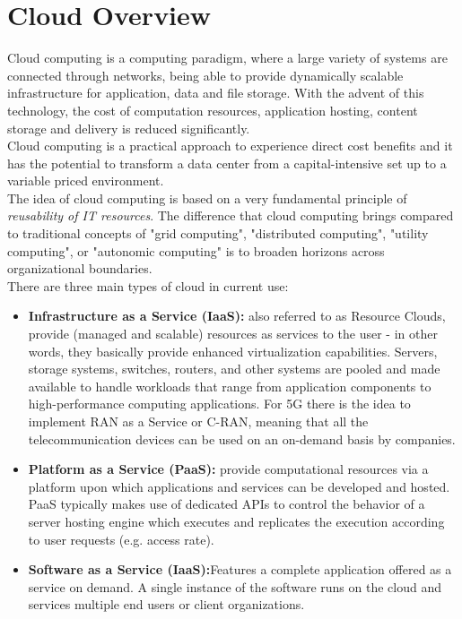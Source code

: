 \section{Cloud Overview}
\label{sec:sdr_cloud}

Cloud computing is a computing paradigm, where a large variety of systems are
connected through networks, being able to provide dynamically scalable
infrastructure for application, data and file storage. With the advent of this
technology, the cost of computation resources, application hosting, content
storage and delivery is reduced significantly. \\

Cloud computing is a practical approach to experience direct cost benefits and
it has the potential to transform a data center from a capital-intensive set up
to a variable priced environment. \\

The idea of cloud computing is based on a very fundamental principle of
\emph{reusability of IT resources}. The difference that cloud computing brings
compared to traditional concepts of "grid computing", "distributed computing",
"utility computing", or "autonomic computing" is to broaden horizons across
organizational boundaries.\\

There are three main types of cloud in current use:

\begin{itemize}
    \item \textbf{Infrastructure as a Service (IaaS):} also referred to as
    Resource Clouds, provide (managed and scalable) resources as services to
    the user - in other words, they basically provide enhanced virtualization
    capabilities. Servers, storage systems, switches, routers, and other systems
    are pooled and made available to handle workloads that range from application
    components to high-performance computing applications. For 5G there is the
    idea to implement RAN as a Service or C-RAN, meaning that all the
    telecommunication devices can be used on an on-demand basis by companies.

    \item \textbf{Platform as a Service (PaaS):} provide computational resources
    via a platform upon which applications and services can be developed and hosted.
    PaaS typically makes use of dedicated APIs to control the behavior of a server
    hosting engine which executes and replicates the execution according to user
    requests (e.g. access rate).

    \item \textbf{Software as a Service (IaaS):}Features a complete application
    offered as a service on demand. A single instance of the software runs on the
    cloud and services multiple end users or client organizations.
\end{itemize}



